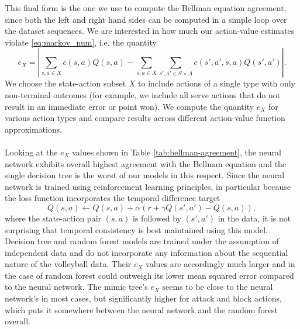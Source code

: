 \documentclass{sfuthesis}
\begin{document}
	This final form is the one we use to compute the Bellman equation agreement, since both the left and right hand sides can be computed in a simple loop over the dataset sequences. We are interested in how much our action-value estimates violate \eqref{eq:markov_num}, i.e. the quantity
	\begin{equation}
		e_X = |\sum_{s,a\in X} c(s,a)Q(s,a) - \sum_{s,a\in X} \sum_{s',a'\in S\times A} c(s',a',s,a) Q(s',a') |.
		\label{eq:markov_num2}
	\end{equation}
	We choose the state-action subset $X$ to include actions of a single type with only non-terminal outcomes (for example, we include all serve actions that do not result in an immediate error or point won). We compute the quantity $e_X$ for various action types and compare results across different action-value function approximations.\\\\
	Looking at the $e_X$ values shown in Table \ref{tab:bellman-agreement}, the neural network exhibits overall highest agreement with the Bellman equation and the single decision tree is the worst of our models in this respect. Since the neural network is trained using reinforcement learning principles, in particular because the loss function incorporates the temporal difference target 
	$$Q(s,a) \leftarrow Q(s,a) + \alpha (r + \gamma Q(s', a') - Q(s,a)),$$
	where the state-action pair $(s,a)$ is followed by $(s',a')$ in the data, it is not surprising that temporal consistency is best maintained using this model. Decision tree and random forest models are trained under the assumption of independent data and do not incorporate any information about the sequential nature of the volleyball data. Their $e_X$ values are accordingly much larger and in the case of random forest could outweigh its lower mean squared error compared to the neural network. The mimic tree's $e_X$ seems to be close to the neural network's in most cases, but significantly higher for attack and block actions, which puts it somewhere between the neural network and the random forest overall.
	
\end{document}
